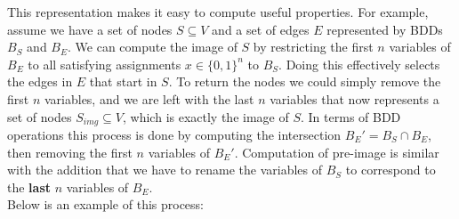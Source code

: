 \documentclass[../master/master.tex]{subfiles}
\begin{document}
This representation makes it easy to compute useful properties. For example, assume we have a set of nodes $S\subseteq V$ and a set of edges $E$ represented by BDDs $B_S$ and $B_E$. We can compute the image of $S$ by restricting the first $n$ variables of $B_E$ to all satisfying assignments $x\in\{0,1\}^{n}$ to $B_S$. Doing this effectively selects the edges in $E$ that start in $S$. To return the nodes we could simply remove the first $n$ variables, and we are left with the last $n$ variables that now represents a set of nodes $S_{img}\subseteq V$, which is exactly the image of $S$. In terms of BDD operations this process is done by computing the intersection $B_{E}' = B_S\cap B_E$, then removing the first $n$ variables of $B_E'$. Computation of pre-image is similar with the addition that we have to rename the variables of $B_S$ to correspond to the \textbf{last} $n$ variables of $B_E$.\\
Below is an example of this process:

\end{document}
